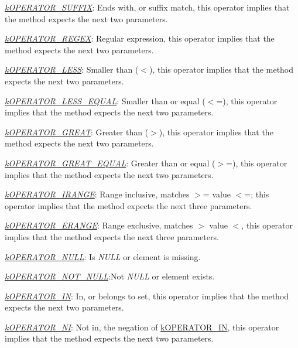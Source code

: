 \begin{DoxyItemize}
\begin{DoxyItemize}
\item {\itshape \hyperlink{}{k\-O\-P\-E\-R\-A\-T\-O\-R\-\_\-\-S\-U\-F\-F\-I\-X}}\-: Ends with, or suffix match, this operator implies that the method expects the next two parameters. 
\item {\itshape \hyperlink{}{k\-O\-P\-E\-R\-A\-T\-O\-R\-\_\-\-R\-E\-G\-E\-X}}\-: Regular expression, this operator implies that the method expects the next two parameters. 
\item {\itshape \hyperlink{}{k\-O\-P\-E\-R\-A\-T\-O\-R\-\_\-\-L\-E\-S\-S}}\-: Smaller than ({\ttfamily $<$}), this operator implies that the method expects the next two parameters. 
\item {\itshape \hyperlink{}{k\-O\-P\-E\-R\-A\-T\-O\-R\-\_\-\-L\-E\-S\-S\-\_\-\-E\-Q\-U\-A\-L}}\-: Smaller than or equal ({\ttfamily $<$=}), this operator implies that the method expects the next two parameters. 
\item {\itshape \hyperlink{}{k\-O\-P\-E\-R\-A\-T\-O\-R\-\_\-\-G\-R\-E\-A\-T}}\-: Greater than ({\ttfamily $>$}), this operator implies that the method expects the next two parameters. 
\item {\itshape \hyperlink{}{k\-O\-P\-E\-R\-A\-T\-O\-R\-\_\-\-G\-R\-E\-A\-T\-\_\-\-E\-Q\-U\-A\-L}}\-: Greater than or equal ({\ttfamily $>$=}), this operator implies that the method expects the next two parameters. 
\item {\itshape \hyperlink{}{k\-O\-P\-E\-R\-A\-T\-O\-R\-\_\-\-I\-R\-A\-N\-G\-E}}\-: Range inclusive, matches {\ttfamily $>$= value $<$=}; this operator implies that the method expects the next three parameters. 
\item {\itshape \hyperlink{}{k\-O\-P\-E\-R\-A\-T\-O\-R\-\_\-\-E\-R\-A\-N\-G\-E}}\-: Range exclusive, matches {\ttfamily $>$ value $<$}, this operator implies that the method expects the next three parameters. 
\item {\itshape \hyperlink{}{k\-O\-P\-E\-R\-A\-T\-O\-R\-\_\-\-N\-U\-L\-L}}\-: Is {\itshape N\-U\-L\-L} or element is missing. 
\item {\itshape \hyperlink{}{k\-O\-P\-E\-R\-A\-T\-O\-R\-\_\-\-N\-O\-T\-\_\-\-N\-U\-L\-L}}\-:Not {\itshape N\-U\-L\-L} or element exists. 
\item {\itshape \hyperlink{}{k\-O\-P\-E\-R\-A\-T\-O\-R\-\_\-\-I\-N}}\-: In, or belongs to set, this operator implies that the method expects the next two parameters. 
\item {\itshape \hyperlink{}{k\-O\-P\-E\-R\-A\-T\-O\-R\-\_\-\-N\-I}}\-: Not in, the negation of \hyperlink{}{k\-O\-P\-E\-R\-A\-T\-O\-R\-\_\-\-I\-N}, this operator implies that the method expects the next two parameters. 

\end{DoxyItemize}
\end{DoxyItemize}
